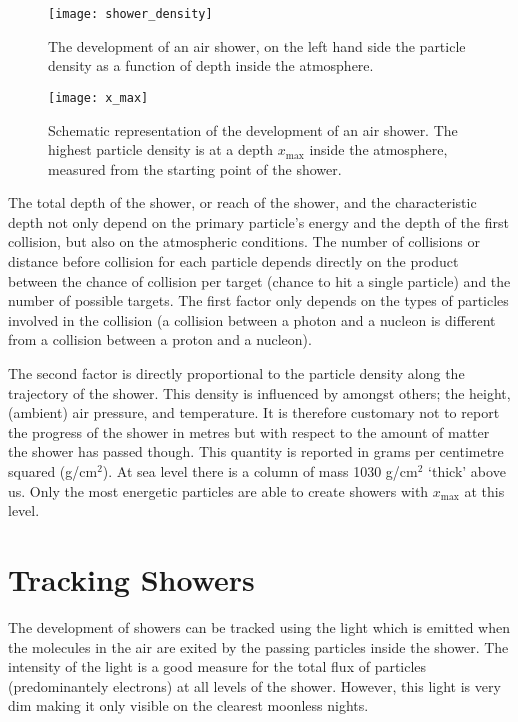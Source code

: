 \begin{figure}\begin{center}
\texttt{[image: shower\_density]}%
\caption{The development of an air shower, on the left hand side the particle density as a function of depth inside the atmosphere.}\label{fig:shower_density}
\end{center}\end{figure}

\begin{figure}\begin{center}
\texttt{[image: x\_max]}%
\caption{Schematic representation of the development of an air shower. The highest particle density is at a depth $x_{\mbox{max}}$ inside the atmosphere, measured from the starting point of the shower.}\label{fig:x_max}
\end{center}\end{figure}

The total depth of the shower, or reach of the shower, and the characteristic depth not only depend on the primary particle's energy and the depth of the first collision, but also on the atmospheric conditions. The number of collisions or distance before collision for each particle depends directly on the product between the chance of collision per target (chance to hit a single particle) and the number of possible targets. The first factor only depends on the types of particles involved in the collision (a collision between a photon and a nucleon is different from a collision between a proton and a nucleon).

The second factor is directly proportional to the particle density along the trajectory of the shower. This density is influenced by amongst others; the height, (ambient) air pressure, and temperature. It is therefore customary not to report the progress of the shower in metres but with respect to the amount of matter the shower has passed though. This quantity is reported in grams per centimetre squared (g/cm$^2$). At sea level there is a column of mass 1030 g/cm$^2$ `thick' above us. Only the most energetic particles are able to create showers with $x_{\mbox{max}}$ at this level.

\section{Tracking Showers}
The development of showers can be tracked using the light which is emitted when the molecules in the air are exited by the passing particles inside the shower. The intensity of the light is a good measure for the total flux of particles (predominantely electrons) at all levels of the shower. However, this light is very dim making it only visible on the clearest moonless nights.

